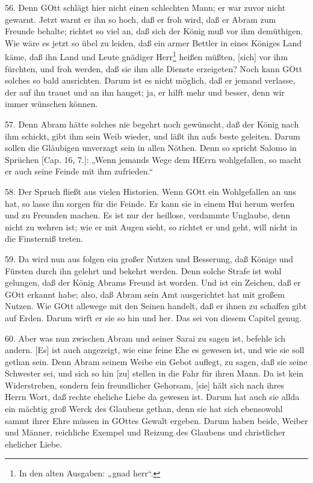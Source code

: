 56. Denn GOtt schlägt hier nicht einen schlechten Mann; er war zuvor nicht gewarnt. Jetzt warnt er ihn so hoch, daß er froh wird, daß er Abram zum Freunde behalte; richtet so viel an, daß sich der König muß vor ihm demüthigen. Wie wäre es jetzt so übel zu leiden, daß ein armer Bettler in eines Königes Land käme, daß ihn Land und Leute gnädiger Herr\footnote{In den alten Ausgaben: „gnad herr“.} heißen müßten, [sich] vor ihm fürchten, und froh werden, daß sie
ihm alle Dienste erzeigeten? Noch kann GOtt solches so bald ausrichten. Darum ist es nicht möglich, daß er jemand verlasse, der auf ihn trauet und an ihn hanget; ja, er hilft mehr und besser, denn wir immer wünschen können.

57. Denn Abram hätte solches nie begehrt noch gewünscht, daß der König nach ihm schickt, gibt ihm sein Weib wieder, und läßt ihn aufs beste geleiten. Darum sollen die Gläubigen unverzagt sein in allen Nöthen. Denn so spricht Salomo in Sprüchen [Cap. 16, 7.]: „Wenn jemands Wege dem HErrn wohlgefallen, so macht er auch seine Feinde mit ihm zufrieden.“

58. Der Spruch fließt aus vielen Historien. Wenn GOtt ein Wohlgefallen an uns hat, so lasse ihn sorgen für die Feinde. Er kann sie in einem Hui herum werfen und zu Freunden machen. Es ist nur der heillose, verdammte Unglaube, denn nicht zu wehren ist; wie er mit Augen sieht, so richtet er und geht, will nicht in die Finsterniß treten.

59. Da wird nun aus folgen ein großer Nutzen und Besserung, daß Könige und Fürsten durch ihn gelehrt und bekehrt werden. Denn solche Strafe ist wohl gelungen, daß der König Abrams Freund ist worden. Und ist ein Zeichen, daß er GOtt erkannt habe; also, daß Abram sein Amt ausgerichtet hat mit großem Nutzen. Wie GOtt allewege mit den Seinen handelt, daß er ihnen zu schaffen gibt auf Erden. Darum wirft er sie so hin und her. Das sei von diesem Capitel genug.

60. Aber was nun zwischen Abram und seiner Sarai zu sagen ist, befehle ich andern. [Es] ist auch angezeigt, wie eine feine Ehe es gewesen ist, und wie sie soll gethan sein. Denn Abram seinem Weibe ein Gebot auflegt, zu sagen, daß sie seine Schwester sei, und sich so hin [zu] stellen in die Fahr für ihren Mann. Da ist kein Widerstreben, sondern fein freundlicher Gehorsam, [sie] hält sich nach ihres Herrn Wort, daß rechte eheliche Liebe da gewesen ist. Darum hat auch sie allda ein mächtig groß Werck des Glaubens gethan, denn sie hat sich ebensowohl sammt ihrer Ehre müssen in GOttes Gewalt ergeben. Darum haben beide, Weiber und Männer, reichliche Exempel und Reizung des Glaubens und christlicher ehelicher Liebe.

